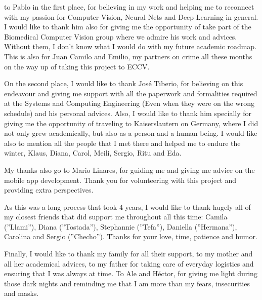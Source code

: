 
 to Pablo in the first place, for believing in my work and helping me to reconnect with my passion for Computer Vision, Neural Nets and Deep Learning in general. I would like to thank him also for giving me the opportunity of take part of the Biomedical Computer Vision group where we admire his work and advices. Without them, I don't know what I would do with my future academic roadmap. This is also for Juan Camilo and Emilio, my partners on crime all these months on the way up of taking this project to ECCV.

On the second place, I would like to thank José Tiberio, for believing on this endeavour and giving me support with all the paperwork and formalities required at the Systems and Computing Engineering (Even when they were on the wrong schedule) and his personal advices. Also, I would like to thank him specially for giving me the opportunity of traveling to Kaiserslautern on Germany, where I did not only grew academically, but also as a person and a human being. I would like also to mention all the people that I met there and helped me to endure the winter, Klaus, Diana, Carol, Meili, Sergio, Ritu and Eda.

My thanks also go to Mario Linares, for guiding me and giving me advice on the mobile app development. Thank you for volunteering with this project and providing extra perspectives.

As this was a long process that took 4 years, I would like to thank hugely all of my closest friends that did support me throughout all this time: Camila (''Llami''), Diana (''Tostada''), Stephannie (''Tefa''), Daniella (''Hermana''), Carolina and Sergio (''Checho''). Thanks for your love, time, patience and humor.

Finally, I would like to thank my family for all their support, to my mother and all her academical advices, to my father for taking care of everyday logistics and ensuring that I was always at time. To Ale and Héctor, for giving me light during those dark nights and reminding me that I am more than my fears, insecurities and masks.

